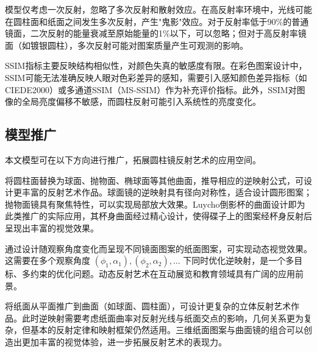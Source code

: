 模型仅考虑一次反射，忽略了多次反射和散射效应。在高反射率环境中，光线可能在圆柱面和纸面之间发生多次反射，产生"鬼影"效应。对于反射率低于90\%的普通镜面，二次反射的能量衰减至原始能量的1\%以下，可以忽略；但对于高反射率镜面（如镀银圆柱），多次反射可能对图案质量产生可观测的影响。

SSIM指标主要反映结构相似性，对颜色失真的敏感度有限。在彩色图案设计中，SSIM可能无法准确反映人眼对色彩差异的感知，需要引入感知颜色差异指标（如CIEDE2000）或多通道SSIM（MS-SSIM）作为补充评价指标。此外，SSIM对图像的全局亮度偏移不敏感，而圆柱反射可能引入系统性的亮度变化。

\subsection{模型推广}

本文模型可在以下方向进行推广，拓展圆柱镜反射艺术的应用空间。

将圆柱面替换为球面、抛物面、椭球面等其他曲面，推导相应的逆映射公式，可设计更丰富的反射艺术作品。球面镜的逆映射具有径向对称性，适合设计圆形图案；抛物面镜具有聚焦特性，可以实现局部放大效果。Luycho倒影杯的曲面设计即为此类推广的实际应用，其杯身曲面经过精心设计，使得碟子上的图案经杯身反射后呈现出丰富的视觉效果。

通过设计随观察角度变化而呈现不同镜面图案的纸面图案，可实现动态视觉效果。这需要在多个观察角度 $(\phi_1, \alpha_1), (\phi_2, \alpha_2), \ldots$ 下同时优化逆映射，是一个多目标、多约束的优化问题。动态反射艺术在互动展览和教育领域具有广阔的应用前景。

将纸面从平面推广到曲面（如球面、圆柱面），可设计更复杂的立体反射艺术作品。此时逆映射需要考虑纸面曲率对反射光线与纸面交点的影响，几何关系更为复杂，但基本的反射定律和映射框架仍然适用。三维纸面图案与曲面镜的组合可以创造出更加丰富的视觉体验，进一步拓展反射艺术的表现力。
